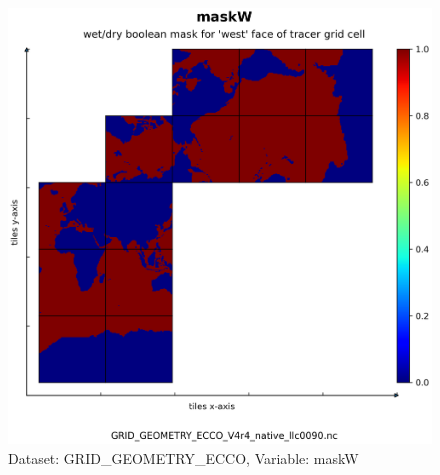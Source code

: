 \begin{figure}[H]
\centering
\includegraphics[scale=0.55]{../images/plots/native_plots_coords/Geometry_Parameters_for_the_Lat-Lon-Cap_90_(llc90)_Native_Model_Grid_(Version_4_Release_4)/maskW.png}
\caption{Dataset: GRID\_GEOMETRY\_ECCO, Variable: maskW}
\label{tab:table-GRID_GEOMETRY_ECCO_maskW-Plot}
\end{figure}
\pagebreak
